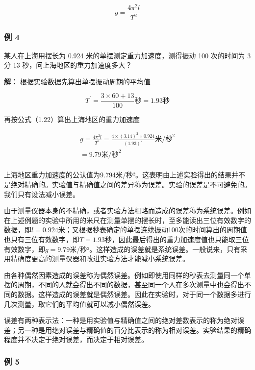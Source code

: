 \[
g = \frac {4 \pi^ {2} l}{T ^ {2}} \tag {1.22}
\]

\subsubsection{例 4}\label{ux4f8b-4}

某人在上海用摆长为 0.924 米的单摆测定重力加速度，测得振动 100 次的时间为
3 分 13 秒，问上海地区的重力加速度多大？

\textbf{解：} 根据实验数据先算出单摆振动周期的平均值

\[
T ^ {\prime} = \frac {3 \times 60 + 13}{100} \text{秒} = 1.93 \text{秒}
\]

再按公式（1.22）算出上海地区的重力加速度

\[
\begin{array}{l} g = \frac {4 \pi^ {2} l}{T ^ {2}} = \frac {4 \times (3.14) ^ {2} \times 0.924}{(1.93) ^ {2}} \text{米/秒} ^ {2} \\ = 9.79 \text{米/秒} ^ {2} \\ \end{array}
\]

上海地区重力加速度的公认值为9.794米/秒²。这表明由上述实验得出的结果并不是绝对精确的。实验值与精确值之间的差异称为误差。实验的误差是不可避免的。我们只有设法减小误差。

由于测量仪器本身的不精确，或者实验方法粗略而造成的误差称为系统误差。例如在上述例题的实验中所用的米尺在测量单摆的摆长时，至多能读出三位有效数字的数据，即\(l = 0.924\)米；又根据秒表确定的单摆连续振动100次的时间算出的周期值也只有三位有效数字，即\(T = 1.93\)秒，因此最后得出的重力加速度值也只能取三位有效数字，即\(g = 9.79\)米/秒²。这样造成的误差就是系统误差。一般说来，只有采用精确度更高的测量仪器和改进实验方法才能减小系统误差。

由各种偶然因素造成的误差称为偶然误差。例如即使用同样的秒表去测量同一个单摆的周期，不同的人就会得出不同的数据，甚至同一个人在多次测量中也会得出不同的数据。这样造成的误差就是偶然误差。因此在实验时，对于同一个数据多进行几次测量，取它们的平均值就可以减小偶然误差。

误差有两种表示法：一种是用实验值与精确值之间的绝对差数表示的称为绝对误差；另一种是用绝对误差与精确值的百分比表示的称为相对误差。实验结果的精确程度并不决定于绝对误差，而决定于相对误差。

\subsubsection{例 5}\label{ux4f8b-5}

